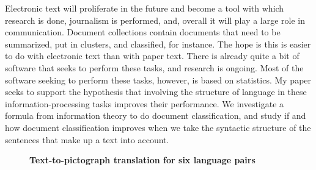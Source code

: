 \documentclass[10pt, a4paper, twopage, headinclude, footinclude, BCOR5mm]{book}
\begin{document}
\begin{table}[t!]
\end{table} 
\noindent
Electronic text will proliferate in the future and become a tool with which research is done, journalism is performed, and, overall it will play a large role in communication.  Document collections contain documents that need to be summarized, put in clusters, and classified, for instance. The hope is this is easier to do with electronic text than with paper text.  There is already quite a bit of software that seeks to perform these tasks, and research is ongoing.  Most of the software seeking to perform these tasks, however, is based on statistics.  My paper seeks to support the hypothesis that involving the structure of language in these information-processing tasks improves their performance. We investigate a formula from information theory to do document classification, and study if and how document classification improves when we take the syntactic structure of the sentences that make up a text into account.  

\newpage

\begin{figure}[t!]
\centering
\large\textbf{Text-to-pictograph translation for six language pairs}
\vspace*{0.5cm}
\end{figure}
\end{document}
